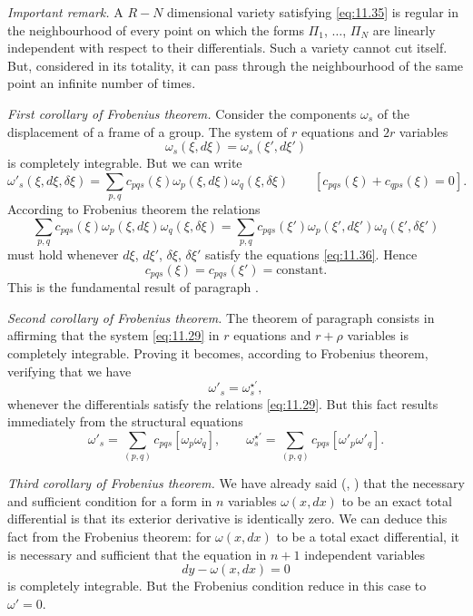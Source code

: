 \somespace

\emph{Important remark.} A $R-N$ dimensional variety satisfying \eqref{eq:11.35} is regular in the neighbourhood of every point on which the forms $\Pi_{1}$, $\dots$, $\Pi_{N}$ are linearly independent with respect to their differentials. Such a variety cannot cut itself. But, considered in its totality, it can pass through the neighbourhood of the same point an infinite number of times.

\somespace

\emph{First corollary of Frobenius theorem.} Consider the components $\omega_{s}$ of the displacement of a frame of a group. The system of $r$ equations and $2r$ variables
\begin{equation}
  \label{eq:11.36}
  \omega_{s}(\xi,d\xi)=\omega_{s}(\xi',d\xi')
\end{equation}
is completely integrable. But we can write
\[
\omega'_{s}(\xi,d\xi,\delta\xi)=\sum_{p,q}c_{pqs}(\xi)\omega_{p}(\xi,d\xi)\omega_{q}(\xi,\delta\xi)\qquad[c_{pqs}(\xi)+c_{qps}(\xi)=0].
\]
According to Frobenius theorem the relations
\[
\sum_{p,q}c_{pqs}(\xi)\omega_{p}(\xi,d\xi)\omega_{q}(\xi,\delta\xi)=\sum_{p,q}c_{pqs}(\xi')\omega_{p}(\xi',d\xi')\omega_{q}(\xi',\delta\xi')
\]
must hold whenever $d\xi$, $d\xi'$, $\delta\xi$, $\delta\xi'$ satisfy the equations \eqref{eq:11.36}. Hence
\[
c_{pqs}(\xi)=c_{pqs}(\xi')=\text{constant}.
\]
This is the fundamental result of paragraph .

\somespace

\emph{Second corollary of Frobenius theorem.} The theorem of paragraph  consists in affirming that the system \eqref{eq:11.29} in $r$ equations and $r+\rho$ variables is completely integrable. Proving it becomes, according to Frobenius theorem, verifying that we have
\[
\omega'_{s}=\omega^{\star\prime}_{s},
\]
whenever the differentials satisfy the relations \eqref{eq:11.29}. But this fact results immediately from the structural equations
\[
\omega'_{s}=\sum_{(p,q)}c_{pqs}[\omega_{p}\omega_{q}],\qquad
\omega^{\star\prime}_{s}=\sum_{(p,q)}c_{pqs}[\omega'_{p}\omega'_{q}].
\]

\emph{Third corollary of Frobenius theorem.} We have already said (, \pageref{sec:155}) that the necessary and sufficient condition for a form in $n$ variables $\omega(x,dx)$ to be an exact total differential is that its exterior derivative is identically zero. We can deduce this fact from the Frobenius theorem: for $\omega(x,dx)$ to be a total exact differential, it is necessary and sufficient that the equation in $n+1$ independent variables
\[
dy-\omega(x,dx)=0
\]
is completely integrable. But the Frobenius condition reduce in this case to $\omega'=0$.

